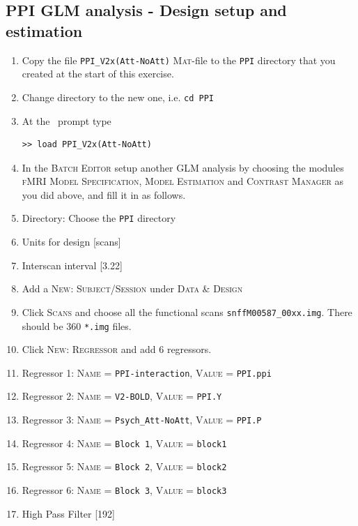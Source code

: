 \subsection{PPI GLM analysis - Design setup and estimation}

\begin{enumerate}
\item Copy the file \texttt{PPI\_V2x(Att-NoAtt)} \textsc{Mat}-file to the \texttt{PPI} directory that you created at the start of this exercise.
\item Change directory to the new one, i.e. \texttt{cd PPI}
\item At the \matlab\ prompt type
\begin{verbatim}
>> load PPI_V2x(Att-NoAtt)
\end{verbatim}

\item In the \textsc{Batch Editor} setup another GLM analysis by choosing the modules \textsc{fMRI Model Specification}, \textsc{Model Estimation} and \textsc{Contrast Manager} as you did above, and fill it in as follows.
\item Directory: Choose the \texttt{PPI} directory
\item Units for design [scans]
\item Interscan interval [3.22]
\item Add a \textsc{New: Subject/Session} under \textsc{Data \& Design}
\item Click \textsc{Scans} and choose all the functional scans \texttt{snffM00587\_00xx.img}. There should be 360 \texttt{*.img} files.
\item Click \textsc{New: Regressor} and add 6 regressors.
\item Regressor 1: \textsc{Name} = \texttt{PPI-interaction}, \textsc{Value} = \texttt{PPI.ppi}
\item Regressor 2: \textsc{Name} = \texttt{V2-BOLD}, \textsc{Value} = \texttt{PPI.Y}
\item Regressor 3: \textsc{Name} = \texttt{Psych\_Att-NoAtt}, \textsc{Value} = \texttt{PPI.P}
\item Regressor 4: \textsc{Name} = \texttt{Block 1}, \textsc{Value} = \texttt{block1}
\item Regressor 5: \textsc{Name} = \texttt{Block 2}, \textsc{Value} = \texttt{block2}
\item Regressor 6: \textsc{Name} = \texttt{Block 3}, \textsc{Value} = \texttt{block3}
\item High Pass Filter [192]\\\\


\end{enumerate}
